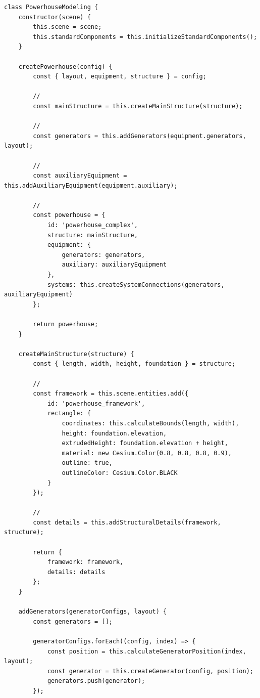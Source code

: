 \begin{lstlisting}[style=javascript]
class PowerhouseModeling {
    constructor(scene) {
        this.scene = scene;
        this.standardComponents = this.initializeStandardComponents();
    }
    
    createPowerhouse(config) {
        const { layout, equipment, structure } = config;
        
        // 
        const mainStructure = this.createMainStructure(structure);
        
        // 
        const generators = this.addGenerators(equipment.generators, layout);
        
        // 
        const auxiliaryEquipment = this.addAuxiliaryEquipment(equipment.auxiliary);
        
        // 
        const powerhouse = {
            id: 'powerhouse_complex',
            structure: mainStructure,
            equipment: {
                generators: generators,
                auxiliary: auxiliaryEquipment
            },
            systems: this.createSystemConnections(generators, auxiliaryEquipment)
        };
        
        return powerhouse;
    }
    
    createMainStructure(structure) {
        const { length, width, height, foundation } = structure;
        
        // 
        const framework = this.scene.entities.add({
            id: 'powerhouse_framework',
            rectangle: {
                coordinates: this.calculateBounds(length, width),
                height: foundation.elevation,
                extrudedHeight: foundation.elevation + height,
                material: new Cesium.Color(0.8, 0.8, 0.8, 0.9),
                outline: true,
                outlineColor: Cesium.Color.BLACK
            }
        });
        
        // 
        const details = this.addStructuralDetails(framework, structure);
        
        return {
            framework: framework,
            details: details
        };
    }
    
    addGenerators(generatorConfigs, layout) {
        const generators = [];
        
        generatorConfigs.forEach((config, index) => {
            const position = this.calculateGeneratorPosition(index, layout);
            const generator = this.createGenerator(config, position);
            generators.push(generator);
        });
        

\end{lstlisting}
